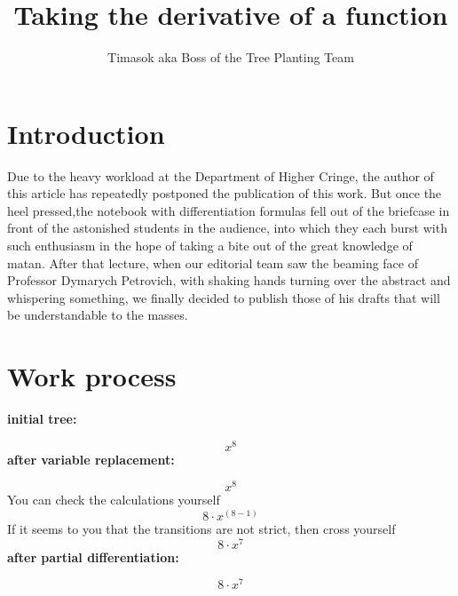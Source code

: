 \documentclass{article}
\title{\textbf{Taking the derivative of a function}}
\author{Timasok aka Boss of the Tree Planting Team}
\begin{document}
\maketitle
\section{Introduction}
Due to the heavy workload at the Department of Higher Cringe, the author of this article has repeatedly postponed the publication of this work. But once the heel pressed,the notebook with differentiation formulas fell out of the briefcase in front of the astonished students in the audience, into which they each burst with such enthusiasm in the hope of taking a bite out of the great knowledge of matan. After that lecture, when our editorial team saw the beaming face of Professor Dymarych Petrovich, with shaking hands turning over the abstract and whispering something, we finally decided to publish those of his drafts that will be understandable to the masses. 
\section{Work process}
\textbf{initial tree:}

$$
x^{8}
$$
\textbf{after variable replacement:}

$$
x^{8}
$$
You can check the calculations yourself
$$
8\cdot x^{(8-1)}
$$
If it seems to you that the transitions are not strict, then cross yourself
$$
8\cdot x^{7}
$$
\textbf{after partial differentiation:}

$$
8\cdot x^{7}
$$
\end{document}
